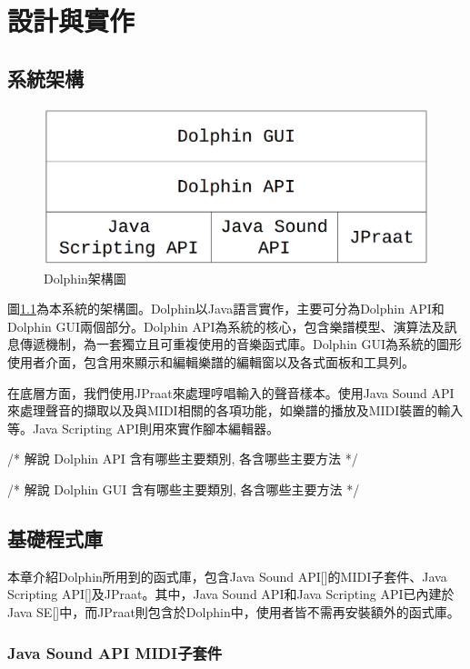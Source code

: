 \documentclass[12pt,a4paper,oneside]{report}
\begin{document}
\chapter{設計與實作} 

\section{系統架構}


\begin{figure}[htb]
\centering
\includegraphics[scale=0.2]{img/framework.png}
\caption{ Dolphin架構圖}
\label{fig:framework}
\end{figure}

圖\ref{fig:framework}為本系統的架構圖。Dolphin以Java語言實作，主要可分為Dolphin API和Dolphin GUI兩個部分。Dolphin API為系統的核心，包含樂譜模型、演算法及訊息傳遞機制，為一套獨立且可重複使用的音樂函式庫。Dolphin GUI為系統的圖形使用者介面，包含用來顯示和編輯樂譜的編輯窗以及各式面板和工具列。

在底層方面，我們使用JPraat來處理哼唱輸入的聲音樣本。使用Java Sound API來處理聲音的擷取以及與MIDI相關的各項功能，如樂譜的播放及MIDI裝置的輸入等。Java Scripting API則用來實作腳本編輯器。


/* 
解說 Dolphin API 含有哪些主要類別, 各含哪些主要方法
*/

/* 
解說 Dolphin GUI 含有哪些主要類別, 各含哪些主要方法
*/

\section{基礎程式庫}

本章介紹Dolphin所用到的函式庫，包含Java Sound API[]的MIDI子套件、Java Scripting API[]及JPraat。其中，Java Sound API和Java Scripting API已內建於Java SE[]中，而JPraat則包含於Dolphin中，使用者皆不需再安裝額外的函式庫。

\subsection{Java Sound API MIDI子套件}
\end{document}
